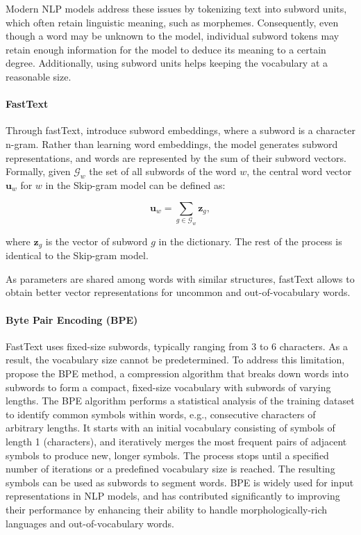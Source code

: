 Modern NLP models address these issues by tokenizing text into subword units, which often retain linguistic meaning, such as morphemes. Consequently, even though a word may be unknown to the model, individual subword tokens may retain enough information for the model to deduce its meaning to a certain degree. Additionally, using subword units helps keeping the vocabulary at a reasonable size.

\paragraph{FastText} Through fastText, \citet{bojanowski2017enriching} introduce subword embeddings, where a subword is a character n-gram. Rather than learning word embeddings, the model generates subword representations, and words are represented by the sum of their subword vectors. Formally, given $\mathcal{G}_w$ the set of all subwords of the word $w$, the central word vector $\bm{u}_w$ for $w$ in the Skip-gram model can be defined as:

\begin{equation}
    \bm{u}_w = \sum_{g \in \mathcal{G}_w} \bm{z}_g,
\end{equation}

where $\bm{z}_g$ is the vector of subword $g$ in the dictionary. The rest of the process is identical to the Skip-gram model.

As parameters are shared among words with similar structures, fastText allows to obtain better vector representations for uncommon and out-of-vocabulary words.

\paragraph{Byte Pair Encoding (BPE)}

FastText uses fixed-size subwords, typically ranging from 3 to 6 characters. As a result, the vocabulary size cannot be predetermined. To address this limitation, \citet{gage1994new} propose the \ac{BPE} method, a compression algorithm that breaks down words into subwords to form a compact, fixed-size vocabulary with subwords of varying lengths. The \ac{BPE} algorithm performs a statistical analysis of the training dataset to identify common symbols within words, e.g., consecutive characters of arbitrary lengths. It starts with an initial vocabulary consisting of symbols of length 1 (characters), and iteratively merges the most frequent pairs of adjacent symbols to produce new, longer symbols. The process stops until a specified number of iterations or a predefined vocabulary size is reached. The resulting symbols can be used as subwords to segment words. \ac{BPE} is widely used for input representations in \ac{NLP} models, and has contributed significantly to improving their performance by enhancing their ability to handle morphologically-rich languages and out-of-vocabulary words.

